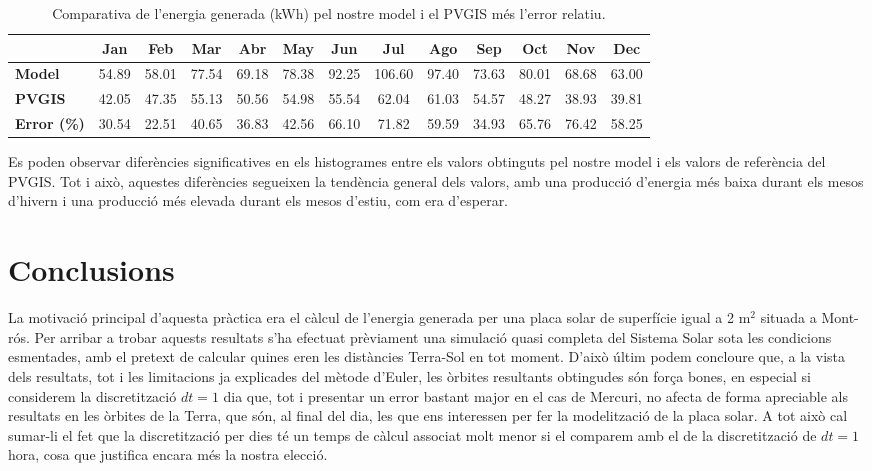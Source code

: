 \documentclass[10pt, twoside, a4paper]{article}
\begin{document}
\begin{table}[h!]
    \centering
    \renewcommand{\arraystretch}{1.5}  %
    \caption{Comparativa de l'energia generada (kWh) pel nostre model i el PVGIS més l'error relatiu.}
    \begin{tabular}{l*{12}{c}} 
        \hline
        \textbf{ } & \textbf{Jan} & \textbf{Feb} & \textbf{Mar} & \textbf{Abr} & \textbf{May} & \textbf{Jun} & \textbf{Jul} & \textbf{Ago} & \textbf{Sep} & \textbf{Oct} & \textbf{Nov} & \textbf{Dec} \\
        \hline
        \textbf{Model} & 54.89 & 58.01 & 77.54 & 69.18 & 78.38 & 92.25 & 106.60 & 97.40 & 73.63 & 80.01 & 68.68 & 63.00 \\
        \textbf{PVGIS} & 42.05 & 47.35 & 55.13 & 50.56 & 54.98 & 55.54 & 62.04 & 61.03 & 54.57 & 48.27 & 38.93 & 39.81 \\
        \textbf{Error (\%)} & 30.54 & 22.51 & 40.65 & 36.83 & 42.56 & 66.10 & 71.82 & 59.59 & 34.93 & 65.76 & 76.42 & 58.25 \\
        \hline
    \end{tabular}
\end{table}


Es poden observar diferències significatives en els histogrames entre els valors obtinguts pel nostre model i els valors de referència del PVGIS. Tot i això, aquestes diferències segueixen la tendència general dels valors, amb una producció d'energia més baixa durant els mesos d'hivern i una producció més elevada durant els mesos d'estiu, com era d'esperar.

\section{Conclusions}

La motivació principal d'aquesta pràctica era el càlcul de l'energia generada per una placa solar de superfície igual a 2 m$^2$ situada a Mont-rós. Per arribar a trobar aquests resultats s'ha efectuat prèviament una simulació quasi completa del Sistema Solar sota les condicions esmentades, amb el pretext de calcular quines eren les distàncies Terra-Sol en tot moment. D'això últim podem concloure que, a la vista dels resultats, tot i les limitacions ja explicades del mètode d'Euler, les òrbites resultants obtingudes són força bones, en especial si considerem la discretització $dt=1$ dia que, tot i presentar un error bastant major en el cas de Mercuri, no afecta de forma apreciable als resultats en les òrbites de la Terra, que són, al final del dia, les que ens interessen per fer la modelització de la placa solar. A tot això cal sumar-li el fet que la discretització per dies té un temps de càlcul associat molt menor si el comparem amb el de la discretització de $dt=1$ hora, cosa que justifica encara més la nostra elecció.
\end{document}
